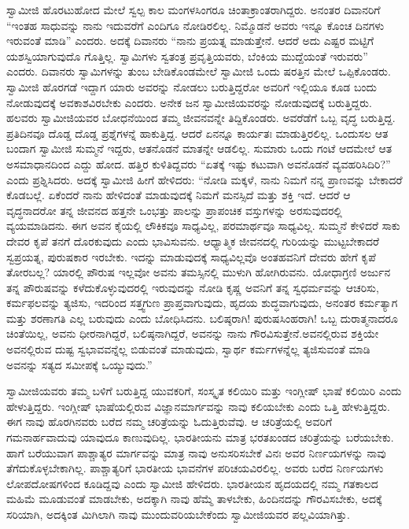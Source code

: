  ಸ್ವಾಮೀಜಿ ಹೊರಟುಹೋದ ಮೇಲೆ ಸ್ವಲ್ಪ ಕಾಲ ಮಂಗಳಸಿಂಗರೂ ಚಿಂತಾಕ್ರಾಂತರಾಗಿದ್ದರು. ಅನಂತರ ದಿವಾನರಿಗೆ “ಇಂತಹ ಸಾಧುವನ್ನು ನಾನು ಇದುವರೆಗೆ ಎಂದಿಗೂ ನೋಡಿರಲಿಲ್ಲ. ನಿಮ್ಮೊಡನೆ ಅವರು ಇನ್ನೂ ಕೊಂಚ ದಿನಗಳು ಇರುವಂತೆ ಮಾಡಿ” ಎಂದರು. ಅದಕ್ಕೆ ದಿವಾನರು “ನಾನು ಪ್ರಯತ್ನ ಮಾಡುತ್ತೇನೆ. ಆದರೆ ಅದು ಎಷ್ಟರ ಮಟ್ಟಿಗೆ ಯಶಸ್ವಿಯಾಗುವುದೊ ಗೊತ್ತಿಲ್ಲ. ಸ್ವಾಮಿಗಳು ಸ್ವತಂತ್ರ ಪ್ರವೃತ್ತಿಯವರು, ಬೆಂಕಿಯ ಮುದ್ದೆಯಂತೆ ಇರುವರು” ಎಂದರು. ದಿವಾನರು ಸ್ವಾಮಿಗಳನ್ನು ತುಂಬ ಬೇಡಿಕೊಂಡಮೇಲೆ ಸ್ವಾಮೀಜಿ ಒಂದು ಷರತ್ತಿನ ಮೇಲೆ ಒಪ್ಪಿಕೊಂಡರು. ಸ್ವಾಮೀಜಿ ಹೊರಗಡೆ ಇದ್ದಾಗ ಯಾರು ಅವರನ್ನು ನೋಡಲು ಬರುತ್ತಿದ್ದರೋ ಅವರಿಗೆ ಇಲ್ಲಿಯೂ ಕೂಡ ಬಂದು ನೋಡುವುದಕ್ಕೆ ಅವಕಾಶವಿರಬೇಕು ಎಂದರು. ಅನೇಕ ಜನ ಸ್ವಾಮೀಜಿಯವರನ್ನು ನೋಡುವುದಕ್ಕೆ ಬರುತ್ತಿದ್ದರು. ಹಲವರು ಸ್ವಾಮೀಜಿಯವರ ಬೋಧನೆಯಿಂದ ತಮ್ಮ ಜೀವನವನ್ನೇ ತಿದ್ದಿಕೊಂಡರು. ಅವರೆಡೆಗೆ ಒಬ್ಬ ವೃದ್ಧ ಬರುತ್ತಿದ್ದ. ಪ್ರತಿದಿನವೂ ದೊಡ್ಡ ದೊಡ್ಡ ಪ್ರಶ್ನೆಗಳನ್ನೆ ಹಾಕುತ್ತಿದ್ದ. ಆದರೆ ಏನನ್ನೂ ಕಾರ್ಯತಃ ಮಾಡುತ್ತಿರಲಿಲ್ಲ. ಒಂದುಸಲ ಆತ ಬಂದಾಗ ಸ್ವಾಮೀಜಿ ಸುಮ್ಮನೆ ಇದ್ದರು, ಆತನೊಡನೆ ಮಾತನ್ನೇ ಆಡಲಿಲ್ಲ. ಸುಮಾರು ಒಂದು ಗಂಟೆ ಆದಮೇಲೆ ಆತ ಅಸಮಾಧಾನದಿಂದ ಎದ್ದು ಹೋದ. ಹತ್ತಿರ ಕುಳಿತಿದ್ದವರು “ಏತಕ್ಕೆ ಇಷ್ಟು ಕಟುವಾಗಿ ಅವನೊಡನೆ ವ್ಯವಹರಿಸಿದಿರಿ?” ಎಂದು ಪ್ರಶ್ನಿಸಿದರು. ಅದಕ್ಕೆ ಸ್ವಾಮೀಜಿ ಹೀಗೆ ಹೇಳಿದರು: “ನೋಡಿ ಮಕ್ಕಳೆ, ನಾನು ನಿಮಗೆ ನನ್ನ ಪ್ರಾಣವನ್ನು ಬೇಕಾದರೆ ಕೊಡಬಲ್ಲೆ. ಏಕೆಂದರೆ ನಾನು ಹೇಳಿದಂತೆ ಮಾಡುವುದಕ್ಕೆ ನಿಮಗೆ ಮನಸ್ಸಿದೆ ಮತ್ತು ಶಕ್ತಿ ಇದೆ. ಆದರೆ ಆ ವೃದ್ಧನಾದರೋ ತನ್ನ ಜೀವನದ ಹತ್ತನೇ ಒಂಭತ್ತು ಪಾಲನ್ನು ಪ್ರಾಪಂಚಿಕ ವಸ್ತುಗಳನ್ನು ಅರಸುವುದರಲ್ಲಿ ವ್ಯಯಮಾಡಿದನು. ಈಗ ಅವನ ಕೈಯಲ್ಲಿ ಲೌಕಿಕವೂ ಸಾಧ್ಯವಿಲ್ಲ, ಪರಮಾರ್ಥವೂ ಸಾಧ್ಯವಿಲ್ಲ. ಸುಮ್ಮನೆ ಕೇಳಿದರೆ ಸಾಕು ದೇವರ ಕೃಪೆ ತನಗೆ ದೊರಕುವುದು ಎಂದು ಭಾವಿಸುವನು. ಆಧ್ಯಾತ್ಮಿಕ ಜೀವನದಲ್ಲಿ ಗುರಿಯನ್ನು ಮುಟ್ಟಬೇಕಾದರೆ ಸ್ವಪ್ರಯತ್ನ, ಪುರುಷಕಾರ ಇರಬೇಕು. ಇದನ್ನು ಮಾಡುವುದಕ್ಕೆ ಸಾಧ್ಯವಿಲ್ಲವೊ ಅಂತಹವನಿಗೆ ದೇವರು ಹೇಗೆ ಕೃಪೆ ತೋರಬಲ್ಲ? ಯಾರಲ್ಲಿ ಪೌರುಷ ಇಲ್ಲವೋ ಅವನು ತಮಸ್ಸಿನಲ್ಲಿ ಮುಳುಗಿ ಹೋಗಿರುವನು. ಯೋಧಾಗ್ರಣಿ ಅರ್ಜುನ ತನ್ನ ಪೌರುಷವನ್ನು ಕಳೆದುಕೊಳ್ಳುವುದರಲ್ಲಿ ಇರುವುದನ್ನು ನೋಡಿ ಕೃಷ್ಣ ಅವನಿಗೆ ತನ್ನ ಸ್ವಧರ್ಮವನ್ನು ಆಚರಿಸು, ಕರ್ಮಫಲವನ್ನು ತ್ಯಜಿಸು, ಇದರಿಂದ ಸತ್ತ್ವಗುಣ ಪ್ರಾಪ್ತವಾಗುವುದು, ಹೃದಯ ಶುದ್ಧವಾಗುವುದು, ಅನಂತರ ಕರ್ಮತ್ಯಾಗ ಮತ್ತು ಶರಣಾಗತಿ ಎಲ್ಲ ಬರುವುದು ಎಂದು ಬೋಧಿಸಿದನು. ಬಲಿಷ್ಠರಾಗಿ! ಪುರುಷಸಿಂಹರಾಗಿ! ಒಬ್ಬ ದುರಾತ್ಮನಾದರೂ ಚಿಂತೆಯಿಲ್ಲ, ಅವನು ಧೀರನಾಗಿದ್ದರೆ, ಬಲಿಷ್ಠನಾಗಿದ್ದರೆ, ಅವನನ್ನು ನಾನು ಗೌರವಿಸುತ್ತೇನೆ.\break ಅವನಲ್ಲಿರುವ ಶಕ್ತಿಯೇ ಅವನಲ್ಲಿರುವ ದುಷ್ಟ ಸ್ವಭಾವವನ್ನೆಲ್ಲ ಬಿಡುವಂತೆ ಮಾಡುವುದು, ಸ್ವಾರ್ಥ ಕರ್ಮಗಳನ್ನೆಲ್ಲ ತ್ಯಜಿಸುವಂತೆ ಮಾಡಿ ಅವನನ್ನು ಸತ್ಯದ ಸಮೀಪಕ್ಕೆ ಒಯ್ಯುವುದು.” 

 ಸ್ವಾಮೀಜಿಯವರು ತಮ್ಮ ಬಳಿಗೆ ಬರುತ್ತಿದ್ದ ಯುವಕರಿಗೆ, ಸಂಸ್ಕೃತ ಕಲಿಯಿರಿ ಮತ್ತು ಇಂಗ್ಲೀಷ್ ಭಾಷೆ ಕಲಿಯಿರಿ ಎಂದು ಹೇಳುತ್ತಿದ್ದರು. ಇಂಗ್ಲೀಷ್ ಭಾಷೆಯಲ್ಲಿರುವ ವಿಜ್ಞಾನಮಾರ್ಗವನ್ನು ನಾವು ಕಲಿಯಬೇಕು ಎಂದು ಒತ್ತಿ ಹೇಳುತ್ತಿದ್ದರು. ಈಗ ನಾವು ಹೊರಗಿನವರು ಬರೆದ ನಮ್ಮ ಚರಿತ್ರೆಯನ್ನು ಓದುತ್ತಿರುವೆವು. ಆ ಚರಿತ್ರೆಯಲ್ಲಿ ಅವರಿಗೆ ಗಮನಾರ್ಹವಾದುವು ಯಾವುದೂ ಕಾಣುವುದಿಲ್ಲ. ಭಾರತೀಯನು ಮಾತ್ರ ಭರತಖಂಡದ ಚರಿತ್ರೆಯನ್ನು ಬರೆಯಬೇಕು. ಹಾಗೆ ಬರೆಯುವಾಗ ಪಾಶ್ಚಾತ್ಯರ ಮಾರ್ಗವನ್ನು ಮಾತ್ರ ನಾವು ಅನುಸರಿಸಬೇಕೆ ವಿನಃ ಅವರ ನಿರ್ಣಯಗಳನ್ನು ನಾವು ತೆಗೆದುಕೊಳ್ಳಬೇಕಾಗಿಲ್ಲ. ಪಾಶ್ಚಾತ್ಯರಿಗೆ ಭಾರತೀಯ ಭಾವನೆಗಳ ಪರಿಚಯವಿರಲಿಲ್ಲ. ಅವರು ಬರೆದ ನಿರ್ಣಯಗಳು ಲೋಪದೋಷಗಳಿಂದ ಕೂಡಿದ್ದವು ಎಂದು ಸ್ವಾಮೀಜಿ ಹೇಳಿದರು. ಭಾರತೀಯನ ಹೃದಯದಲ್ಲಿ ನಮ್ಮ ಗತಕಾಲದ ಮಹಿಮೆ ಮೂಡುವಂತೆ ಮಾಡಬೇಕು, ಅದಕ್ಕಾಗಿ ನಾವು ಹೆಮ್ಮೆ ತಾಳಬೇಕು, ಹಿಂದಿನದನ್ನು ಗೌರವಿಸಬೇಕು, ಅದಕ್ಕೆ ಸರಿಯಾಗಿ, ಅದಕ್ಕಿಂತ ಮಿಗಿಲಾಗಿ ನಾವು ಮುಂದುವರಿಯಬೇಕೆಂದು ಸ್ವಾಮೀಜಿಯವರ ಪಲ್ಲವಿಯಾಗಿತ್ತು. 

